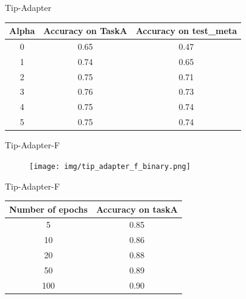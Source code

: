 \documentclass[11pt,compress]{beamer} %
\begin{document}
  \begin{frame}{Tip-Adapter}
    \begin{table}[H]
      \centering
      \begin{tabular}{|c|c|c|}
      \hline
      \textbf{Alpha} & \textbf{Accuracy on TaskA} & \textbf{Accuracy on test\_meta} \\ \hline
      0 & 0.65 & 0.47 \\ \hline
      1 & 0.74 & 0.65 \\ \hline
      2 & 0.75 & 0.71 \\ \hline
      3 & 0.76 & 0.73 \\ \hline
      4 & 0.75 & 0.74 \\ \hline
      5 & 0.75 & 0.74 \\ \hline
      \end{tabular}
      \label{tab:alpha}
    \end{table}  
\end{frame}

\begin{frame}{Tip-Adapter-F}
  \centering
  \begin{figure}
    \texttt{[image: img/tip\_adapter\_f\_binary.png]}
  \end{figure}
\end{frame}

\begin{frame}{Tip-Adapter-F}
  \begin{table}[H]
    \centering
    \begin{tabular}{|c|c|}
    \hline
    \textbf{Number of epochs} & \textbf{Accuracy on taskA} \\ \hline
    5   & 0.85 \\ \hline
    10  & 0.86 \\ \hline
    20  & 0.88 \\ \hline
    50  & 0.89 \\ \hline
    100 & 0.90 \\ \hline
    \end{tabular}
  \end{table}
\end{frame}
\end{document}
